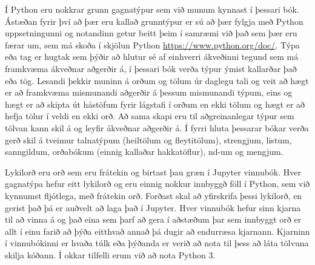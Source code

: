 Í Python eru nokkrar grunn gagnatýpur sem við munum kynnast í þessari bók. 
Ástæðan fyrir því að þær eru kallað grunntýpur er sú að þær fylgja með Python uppsetningunni og notandinn getur beitt þeim í samræmi við það sem þær eru færar um, sem má skoða í skjölun Python \href{https://www.python.org/doc/}{https://www.python.org/doc/}. 
Týpa eða tag er hugtak sem þýðir að hlutur sé af einhverri ákveðinni tegund sem má framkvæma ákveðnar aðgerðir á, í þessari bók verða týpur ýmist kallarðar það eða tög. 
Lesandi þekkir muninn á orðum og tölum úr daglegu tali og veit að hægt er að framkvæma mismunandi aðgerðir á þessum mismunandi týpum, eins og hægt er að skipta út hástöfum fyrir lágstafi í orðum en ekki tölum og hægt er að hefja tölur í veldi en ekki orð. 
Að sama skapi eru til aðgreinanlegar týpur sem tölvan kann skil á og leyfir ákveðnar aðgerðir á.
Í fyrri hluta þessarar bókar verða gerð skil á tveimur talnatýpum (heiltölum og fleytitölum), strengjum, listum, sanngildum, orðabókum (einnig kallaðar hakkatöflur), nd-um og mengjum.

Lykilorð eru orð sem eru frátekin og birtast þau græn í Jupyter vinnubók. 
Hver gagnatýpa hefur eitt lykilorð og eru einnig nokkur innbyggð föll í Python, sem við kynnumst fljótlega, með frátekin orð. 
Forðast skal að yfirskrifa þessi lykilorð, en gerist það þá er auðvelt að laga það í Jupyter. 
Hver vinnubók hefur sinn kjarna til að vinna á og það eina sem þarf að gera í aðstæðum þar sem innbyggt orð er allt í einu farið að þýða eitthvað annað þá dugir að endurræsa kjarnann.
Kjarninn í vinnubókinni er hvaða túlk eða þýðanda er verið að nota til þess að láta tölvuna skilja kóðann.
Í okkar tilfelli erum við að nota Python 3.